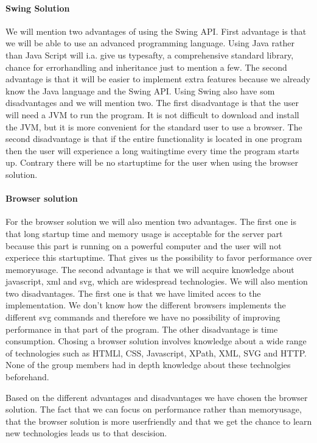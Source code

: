 \documentclass[a4paper,10pt,titlepage]{article}
\begin{document}
\paragraph{Swing Solution}
We will mention two advantages of using the Swing API. First advantage is that we will be able to use an advanced programming language. Using Java rather than Java Script will i.a. give us typesafty, a comprehensive standard library, chance for errorhandling and inheritance just to mention a few. The second advantage is that it will be easier to implement extra features because we already know the Java language and the Swing API. Using Swing also have som disadvantages and we will mention two. The first disadvantage is that the user will need a JVM to run the program. It is not difficult to download and install the JVM, but it is more convenient for the standard user to use a browser. The second disadvantage is that if the entire functionality is located in one program then the user will experience a long waitingtime every time the program starts up. Contrary there will be no startuptime for the user when using the browser solution. 

\paragraph{Browser solution}
For the browser solution we will also mention two advantages. The first one is that long startup time and memory usage is acceptable for the server part because this part is running on a powerful computer and the user will not experiece this startuptime. That gives us the possibility to favor performance over memoryusage. The second advantage is that we will acquire knowledge about javascript, xml and svg, which are widespread technologies. We will also mention two disadvantages. The first one is that we have limited acces to the implementation. We don't know how the different browsers implements the different svg commands and therefore we have no possibility of improving performance in that part of the program. The other disadvantage is time consumption. Chosing a browser solution involves knowledge about a wide range of technologies such as HTMLl, CSS, Javascript, XPath, XML, SVG and HTTP. None of the group members had in depth knowledge about these technolgies beforehand.    

Based on the different advantages and disadvantages we have chosen the browser solution. The fact that we can focus on performance rather than memoryusage, that the browser solution is more userfriendly and that we get the chance to learn new technologies leads us to that descision.
\end{document}
